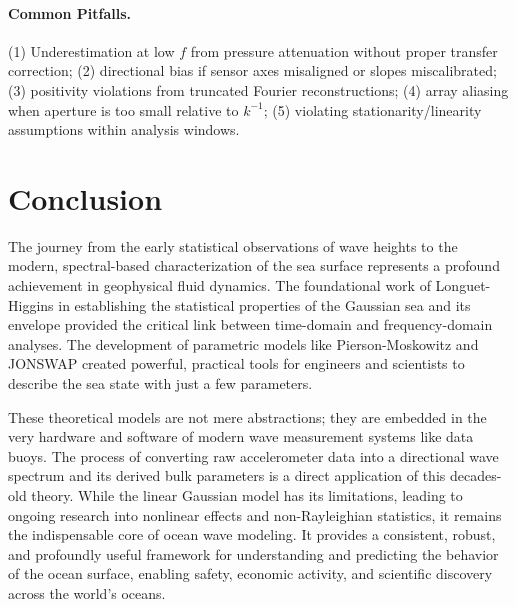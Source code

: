 \documentclass[12pt]{article}
\begin{document}
\paragraph{Common Pitfalls.}
(1) Underestimation at low $f$ from pressure attenuation without proper transfer correction; (2) directional bias if sensor axes misaligned or slopes miscalibrated; (3) positivity violations from truncated Fourier reconstructions; (4) array aliasing when aperture is too small relative to $k^{-1}$; (5) violating stationarity/linearity assumptions within analysis windows.

\section{Conclusion}
The journey from the early statistical observations of wave heights to the modern, spectral-based characterization of the sea surface represents a profound achievement in geophysical fluid dynamics. The foundational work of Longuet-Higgins in establishing the statistical properties of the Gaussian sea and its envelope provided the critical link between time-domain and frequency-domain analyses. The development of parametric models like Pierson-Moskowitz and JONSWAP created powerful, practical tools for engineers and scientists to describe the sea state with just a few parameters.

These theoretical models are not mere abstractions; they are embedded in the very hardware and software of modern wave measurement systems like data buoys. The process of converting raw accelerometer data into a directional wave spectrum and its derived bulk parameters is a direct application of this decades-old theory. While the linear Gaussian model has its limitations, leading to ongoing research into nonlinear effects and non-Rayleighian statistics, it remains the indispensable core of ocean wave modeling. It provides a consistent, robust, and profoundly useful framework for understanding and predicting the behavior of the ocean surface, enabling safety, economic activity, and scientific discovery across the world's oceans.
\end{document}
